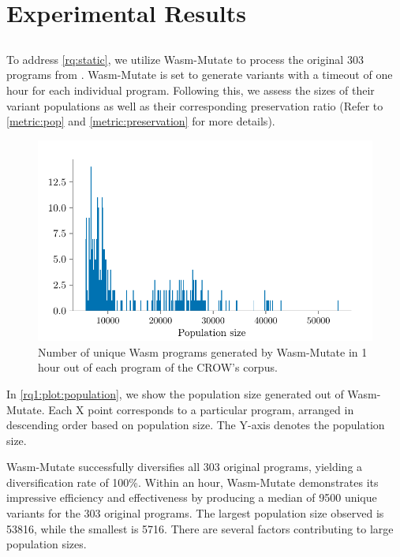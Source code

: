 \documentclass[sigplan,screen]{acmart}
\newcommand{\tool}{{\sc Wasm-Mutate}\xspace}
\newcommand{\wasm}{Wasm\xspace}
\begin{document}
\section{Experimental Results}
\label{results}

\subsection{\rqstatic}
\label{rq:static:results}

\newcommand{\preserved}{62\%\xspace}

To address \ref{rq:static}, we utilize \tool to process the original 303 programs from \cite{arteaga2020crow}. 
\tool is set to generate variants with a timeout of one hour for each individual program. 
Following this, we assess the sizes of their variant populations as well as their corresponding preservation ratio (Refer to \autoref{metric:pop} and \autoref{metric:preservation} for more details).

\begin{figure}
    \centering
    \includegraphics[width=\linewidth]{plots/rq1/population.pdf}
    \caption{Number of unique \wasm programs generated by \tool in 1 hour out of each program of the CROW's corpus.}
  \label{rq1:plot:population}
\end{figure}


In \autoref{rq1:plot:population}, we show the population size generated out of \tool. 
Each X point corresponds to a particular program, arranged in descending order based on population size. 
The Y-axis denotes the population size. 

\tool successfully diversifies all 303 original programs, yielding a diversification rate of 100\%. 
Within an hour, \tool demonstrates its impressive efficiency and effectiveness by producing a median of 9500 unique variants for the 303 original programs.
The largest population size observed is 53816, while the smallest is 5716.
There are several factors contributing to large population sizes. 
\end{document}
